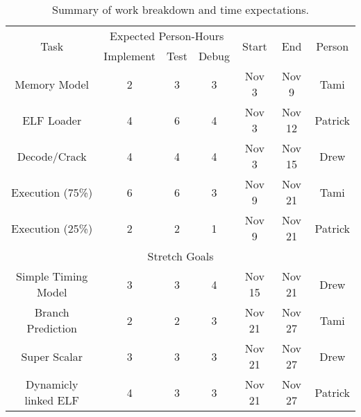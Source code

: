 \documentclass[12pt]{article}
\begin{document}
\begin{table}
\begin{center}
\begin{tabular}{|c|c|c|c|c|c|c|}
\hline
\multirow{2}{*}{Task}      &  \multicolumn{3}{|c|}{Expected Person-Hours}    &  \multirow{2}{*}{Start} & \multirow{2}{*}{End} & \multirow{2}{*}{Person} \\
                           &  Implement     & Test       & Debug            &                         &                      &                         \\
\hline
\hline
  Memory Model             &   2            & 3          & 3                & Nov 3                   & Nov 9                & Tami  \\
  ELF Loader               &   4            & 6          & 4                & Nov 3                   & Nov 12               & Patrick \\
  Decode/Crack             &   4            & 4          & 4                & Nov 3                   & Nov 15               & Drew \\
  Execution (75\%)         &   6            & 6          & 3                & Nov 9                   & Nov 21               & Tami \\
  Execution (25\%)         &   2            & 2          & 1                & Nov 9                   & Nov 21               & Patrick \\
\hline
 \multicolumn{7}{|c|}{Stretch Goals} \\
\hline
Simple Timing Model        &   3           & 3         &   4                & Nov 15                  & Nov 21               & Drew \\
Branch Prediction          &   2           & 2         &   3                & Nov 21                  & Nov 27               & Tami \\
Super Scalar               &   3           & 3         &   3                & Nov 21                  & Nov 27               & Drew \\
Dynamicly linked ELF       &   4           & 3         &   3                & Nov 21                  & Nov 27               & Patrick \\

\hline
\end{tabular}
\caption{Summary of work breakdown and time expectations.}
\label{Table:planSummary}
\end{center}
\end{table}
\end{document}
